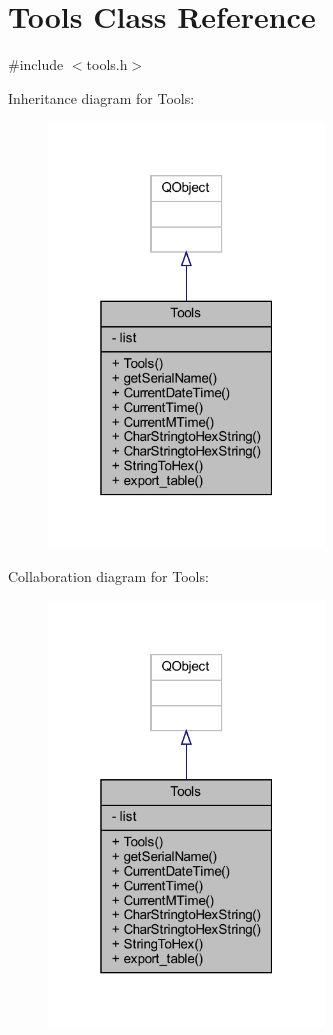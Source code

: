 \hypertarget{class_tools}{}\section{Tools Class Reference}
\label{class_tools}


{\ttfamily \#include $<$tools.\+h$>$}



Inheritance diagram for Tools\+:
\nopagebreak
\begin{figure}[H]
\begin{center}
\leavevmode
\includegraphics[width=208pt]{class_tools__inherit__graph}
\end{center}
\end{figure}


Collaboration diagram for Tools\+:
\nopagebreak
\begin{figure}[H]
\begin{center}
\leavevmode
\includegraphics[width=208pt]{class_tools__coll__graph}
\end{center}
\end{figure}
